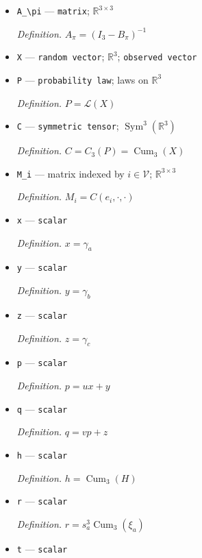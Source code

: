 \documentclass{article}
\begin{document}
\begin{itemize}
  \par\smallskip\noindent\emph{Definition.} \(B_\pi(u,v)=u e_b e_a^{\mathsf T}+v e_c e_b^{\mathsf T}\)
  \item \texttt{A\_\allowbreak{}\textbackslash{}\allowbreak{}pi} --- \texttt{matrix}; \(\mathbb R^{3\times3}\)
  \par\smallskip\noindent\emph{Definition.} \(A_\pi=(I_3-B_\pi)^{-1}\)
  \item \texttt{X} --- \texttt{random vector}; \(\mathbb R^3\); \texttt{observed vector}
  \item \texttt{P} --- \texttt{probability law}; laws on \(\mathbb R^3\)
  \par\smallskip\noindent\emph{Definition.} \(P=\mathcal L(X)\)
  \item \texttt{C} --- \texttt{symmetric tensor}; \(\operatorname{Sym}^3(\mathbb R^3)\)
  \par\smallskip\noindent\emph{Definition.} \(C=C_3(P)=\operatorname{Cum}_3(X)\)
  \item \texttt{M\_\allowbreak{}i} --- matrix indexed by \(i\in\mathcal V\); \(\mathbb R^{3\times3}\)
  \par\smallskip\noindent\emph{Definition.} \(M_i=C(e_i,\cdot,\cdot)\)
  \item \texttt{x} --- \texttt{scalar}
  \par\smallskip\noindent\emph{Definition.} \(x=\gamma_a\)
  \item \texttt{y} --- \texttt{scalar}
  \par\smallskip\noindent\emph{Definition.} \(y=\gamma_b\)
  \item \texttt{z} --- \texttt{scalar}
  \par\smallskip\noindent\emph{Definition.} \(z=\gamma_c\)
  \item \texttt{p} --- \texttt{scalar}
  \par\smallskip\noindent\emph{Definition.} \(p=ux+y\)
  \item \texttt{q} --- \texttt{scalar}
  \par\smallskip\noindent\emph{Definition.} \(q=vp+z\)
  \item \texttt{h} --- \texttt{scalar}
  \par\smallskip\noindent\emph{Definition.} \(h=\operatorname{Cum}_3(H)\)
  \item \texttt{r} --- \texttt{scalar}
  \par\smallskip\noindent\emph{Definition.} \(r=s_a^3\operatorname{Cum}_3(\xi_a)\)
  \item \texttt{t} --- \texttt{scalar}

\end{itemize}
\end{document}
